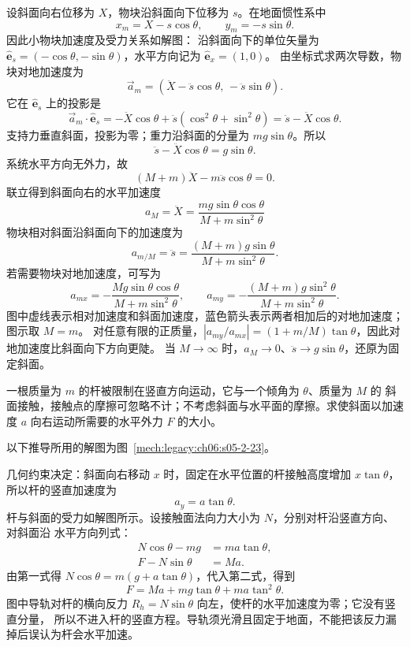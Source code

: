 {\begin{xesolution}
设斜面向右位移为 $X$，物块沿斜面向下位移为 $s$。在地面惯性系中
\[
 x_m=X-s\cos\theta,
 \qquad
 y_m=-s\sin\theta.
\]
因此小物块加速度及受力关系如解图：
\soldiagTwoTwentyTwo
沿斜面向下的单位矢量为 $\hat{\boldsymbol e}_s=(-\cos\theta,-\sin\theta)$，水平方向记为 $\hat{\boldsymbol e}_x=(1,0)$。
由坐标式求两次导数，物块对地加速度为
\[
 \vec a_m=(\ddot X-\ddot s\cos\theta,\,-\ddot s\sin\theta).
\]
它在 $\hat{\boldsymbol e}_s$ 上的投影是
\[
 \vec a_m\cdot\hat{\boldsymbol e}_s
 =-\ddot X\cos\theta+\ddot s(\cos^2\theta+\sin^2\theta)
 =\ddot s-\ddot X\cos\theta.
\]
支持力垂直斜面，投影为零；重力沿斜面的分量为 $mg\sin\theta$。所以
\[
 \ddot s-\ddot X\cos\theta=g\sin\theta.
\]
系统水平方向无外力，故
\[
 (M+m)\ddot X-m\ddot s\cos\theta=0.
\]
联立得到斜面向右的水平加速度
\[
 \boxed{a_M=\ddot X
 =\frac{mg\sin\theta\cos\theta}
 {M+m\sin^2\theta}}
\]
物块相对斜面沿斜面向下的加速度为
\[
 \boxed{a_{m/M}=\ddot s
 =\frac{(M+m)g\sin\theta}
 {M+m\sin^2\theta}}.
\]
若需要物块对地加速度，可写为
\[
\boxed{a_{mx}=-\frac{Mg\sin\theta\cos\theta}{M+m\sin^2\theta},
 \qquad
 a_{my}=-\frac{(M+m)g\sin^2\theta}{M+m\sin^2\theta}}.
\]
图中虚线表示相对加速度和斜面加速度，蓝色箭头表示两者相加后的对地加速度；图示取 $M=m$。
对任意有限的正质量，$|a_{my}/a_{mx}|=(1+m/M)\tan\theta$，因此对地加速度比斜面向下方向更陡。
当 $M\to\infty$ 时，$a_M\to0$、$\ddot s\to g\sin\theta$，还原为固定斜面。
\end{xesolution}

\begin{origexamplebox}{}\label{ch06:ex:s05-2-23}
一根质量为 $m$ 的杆被限制在竖直方向运动，它与一个倾角为 $\theta$、质量为 $M$ 的
斜面接触，接触点的摩擦可忽略不计；不考虑斜面与水平面的摩擦。求使斜面以加速度 $a$
向右运动所需要的水平外力 $F$ 的大小。
\probdiagTwoTwentyThree
\end{origexamplebox}

\begin{xesolution}
以下推导所用的解图为图~\ref{mech:legacy:ch06:s05-2-23}。

几何约束决定：斜面向右移动 $x$ 时，固定在水平位置的杆接触高度增加 $x\tan\theta$，
所以杆的竖直加速度为
\[
 a_y=a\tan\theta.
\]
杆与斜面的受力如解图所示。设接触面法向力大小为 $N$，分别对杆沿竖直方向、对斜面沿
水平方向列式：
\soldiagTwoTwentyThree
\begin{align*}
 N\cos\theta-mg&=ma\tan\theta,\\
 F-N\sin\theta&=Ma.
\end{align*}
由第一式得 $N\cos\theta=m(g+a\tan\theta)$，代入第二式，得到
\[
 \boxed{F=Ma+mg\tan\theta+ma\tan^2\theta}.
\]
图中导轨对杆的横向反力 $R_h=N\sin\theta$ 向左，使杆的水平加速度为零；它没有竖直分量，
所以不进入杆的竖直方程。导轨须光滑且固定于地面，不能把该反力漏掉后误认为杆会水平加速。
\end{xesolution}
}

